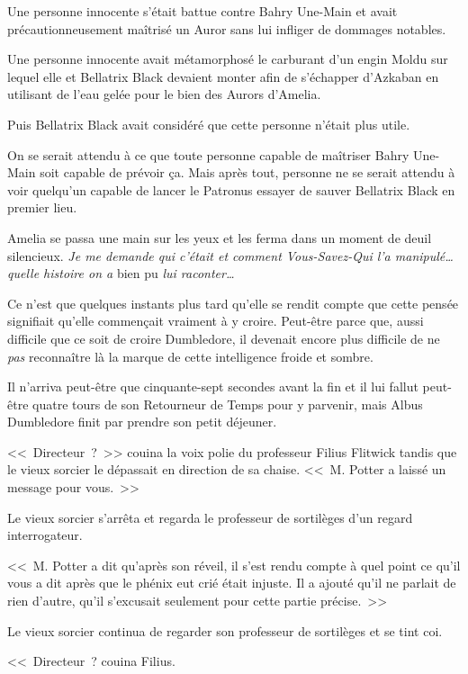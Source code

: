 Une personne innocente s'était battue contre Bahry Une-Main et avait précautionneusement maîtrisé un Auror sans lui infliger de dommages notables.

Une personne innocente avait métamorphosé le carburant d'un engin Moldu sur lequel elle et Bellatrix Black devaient monter afin de s'échapper d'Azkaban en utilisant de l'eau gelée pour le bien des Aurors d'Amelia.

Puis Bellatrix Black avait considéré que cette personne n'était plus utile.

On se serait attendu à ce que toute personne capable de maîtriser Bahry Une-Main soit capable de prévoir ça. Mais après tout, personne ne se serait attendu à voir quelqu'un capable de lancer le Patronus essayer de sauver Bellatrix Black en premier lieu.

Amelia se passa une main sur les yeux et les ferma dans un moment de deuil silencieux. \emph{Je me demande qui c'était et comment Vous-Savez-Qui l'a manipulé… quelle histoire on a} bien pu \emph{lui raconter…}

Ce n'est que quelques instants plus tard qu'elle se rendit compte que cette pensée signifiait qu'elle commençait vraiment à y croire. Peut-être parce que, aussi difficile que ce soit de croire Dumbledore, il devenait encore plus difficile de ne \emph{pas} reconnaître là la marque de cette intelligence froide et sombre.


Il n'arriva peut-être que cinquante-sept secondes avant la fin et il lui fallut peut-être quatre tours de son Retourneur de Temps pour y parvenir, mais Albus Dumbledore finit par prendre son petit déjeuner.

<<~Directeur~?~>> couina la voix polie du professeur Filius Flitwick tandis que le vieux sorcier le dépassait en direction de sa chaise. <<~M. Potter a laissé un message pour vous.~>>

Le vieux sorcier s'arrêta et regarda le professeur de sortilèges d'un regard interrogateur.

<<~M. Potter a dit qu'après son réveil, il s'est rendu compte à quel point ce qu'il vous a dit après que le phénix eut crié était injuste. Il a ajouté qu'il ne parlait de rien d'autre, qu'il s'excusait seulement pour cette partie précise.~>>

Le vieux sorcier continua de regarder son professeur de sortilèges et se tint coi.

<<~Directeur~? couina Filius.

